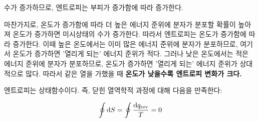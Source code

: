         수가 증가하므로, 엔트로피는 부피가 증가함에 따라 증가한다.
        \par 마찬가지로, 온도가 증가함에 따라 더 높은 에너지 준위에 분자가 분포할 확률이 높아져 온도가 증가하면 
        미시상태의 수가 증가한다. 따라서 엔트로피는 온도가 증가함에 따라 증가한다. 이때 높은 온도에서는 이미 많은 에너지 준위에 분자가 분포하므로, 여기서 온도가 
        증가하면 '열리게 되는' 에너지 준위가 적다. 그러나 낮은 온도에서는 적은 에너지 준위에 분자가 분포하므로, 온도가 증가하면 '열리게 되는' 에너지 준위가 상대적으로 
        많다. 따라서 같은 열을 가했을 때 \textbf{온도가 낮을수록 엔트로피 변화가 크다.} 
        \par 엔트로피는 상태함수이다. 즉, 닫힌 열역학적 과정에 대해 다음을 만족한다:
        \begin{obs}
        \begin{equation*}
            \oint \operatorname{d\!} S = \oint \frac{\operatorname{d\!} q_\mathrm{rev}}{T} = 0
        \end{equation*}
        \end{obs}

